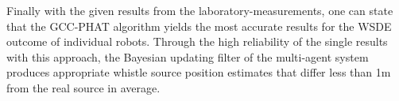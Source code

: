 Finally with the given results from the laboratory-measurements, one can state that
the \acf{GCC-PHAT} algorithm yields the most
accurate results for the \acf{WSDE} outcome of individual robots.
Through the high reliability of the single results with this approach, the Bayesian updating
filter of the multi-agent system produces appropriate whistle source position estimates that
differ less than 1\si{\meter} from the real source in average.


